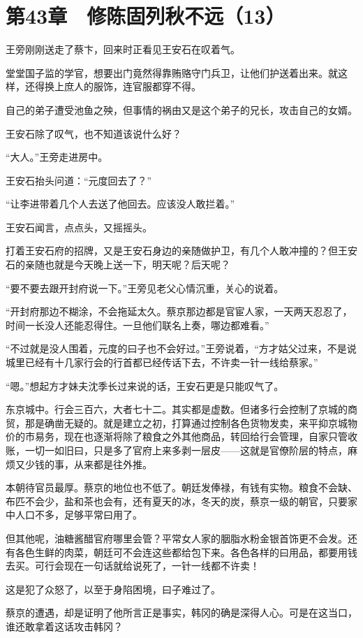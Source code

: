 \section{第43章　修陈固列秋不远（13）}

王旁刚刚送走了蔡卞，回来时正看见王安石在叹着气。

堂堂国子监的学官，想要出门竟然得靠贿赂守门兵卫，让他们护送着出来。就这样，还得换上庶人的服饰，连官服都穿不得。

自己的弟子遭受池鱼之殃，但事情的祸由又是这个弟子的兄长，攻击自己的女婿。

王安石除了叹气，也不知道该说什么好？

“大人。”王旁走进房中。

王安石抬头问道：“元度回去了？”

“让李进带着几个人去送了他回去。应该没人敢拦着。”

王安石闻言，点点头，又摇摇头。

打着王安石府的招牌，又是王安石身边的亲随做护卫，有几个人敢冲撞的？但王安石的亲随也就是今天晚上送一下，明天呢？后天呢？

“要不要去跟开封府说一下。”王旁见老父心情沉重，关心的说着。

“开封府那边不糊涂，不会拖延太久。蔡京那边都是官宦人家，一天两天忍忍了，时间一长没人还能忍得住。一旦他们联名上奏，哪边都难看。”

“不过就是没人围着，元度的曰子也不会好过。”王旁说着，“方才姑父过来，不是说城里已经有十几家行会的行首都已经传话下去，不许卖一针一线给蔡家。”

“嗯。”想起方才妹夫沈季长过来说的话，王安石更是只能叹气了。

东京城中。行会三百六，大者七十二。其实都是虚数。但诸多行会控制了京城的商贸，那是确凿无疑的。就是建立之初，打算通过控制各色货物发卖，来平抑京城物价的市易务，现在也逐渐将除了粮食之外其他商品，转回给行会管理，自家只管收账，一切一如旧曰，只是多了官府上来多剥一层皮——这就是官僚阶层的特点，麻烦又少钱的事，从来都是往外推。

本朝待官员最厚。蔡京的地位也不低了。朝廷发俸禄，有钱有实物。粮食不会缺、布匹不会少，盐和茶也会有，还有夏天的冰，冬天的炭，蔡京一级的朝官，只要家中人口不多，足够平常曰用了。

但其他呢，油糖酱醋官府哪里会管？平常女人家的胭脂水粉金银首饰更不会发。还有各色生鲜的肉菜，朝廷可不会连这些都给包下来。各色各样的曰用品，都要用钱去买。可行会现在一句话就给说死了，一针一线都不许卖！

这是犯了众怒了，以至于身陷困境，曰子难过了。

蔡京的遭遇，却是证明了他所言正是事实，韩冈的确是深得人心。可是在这当口，谁还敢拿着这话攻击韩冈？

